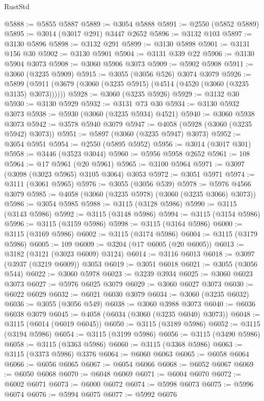 \begin{lexlean}{RustStd}
\begin{coremodule}
@5888 := @5855 @5887
@5889 := @3054 @5888
@5891 := @2550 (@5852 @5889)
@5895 := @3014 (@3017 @291) @3447 @2652
@5896 := @3132 @103
@5897 := @3130 @5896
@5898 := @3132 @291
@5899 := @3130 @5898
@5901 := @3131 @156 @30
@5902 := @3130 @5901
@5904 := @3131 @339 @22
@5906 := @3130 @5904 @3073
@5908 := @3060 @5906 @3073
@5909 := @5902 @5908
@5911 := @3060 (@3235 @5909)
@5915 := @3055 (@3056 @526) @3074 @3079
@5926 := @5899 (@5911 (@3679 (@3060 (@3235 @5915) (@4514 (@4520 (@3060 (@3235 @3135) @3073))))))
@5928 := @3060 (@3235 @5926)
@5929 := @3132 @30
@5930 := @3130 @5929
@5932 := @3131 @73 @30
@5934 := @3130 @5932 @3073
@5938 := @5930 (@3060 (@3235 @5934) @4521)
@5940 := @3060 @5938 @3073
@5942 := @3578 @5940 @3079
@5947 := @4058 (@5928 (@3060 (@3235 @5942) @3073))
@5951 := @5897 (@3060 (@3235 @5947) @3073)
@5952 := @3054 @5951
@5954 := @2550 (@5895 @5952)
@5956 := @3014 (@3017 @301)
@5958 := @3446 (@3523 @3044)
@5960 := @5956 @5958 @2652
@5961 := 108
@5964 := @17 @5961 (@20 @5961)
@5965 := @3100 @5964
@5971 := @3097 (@3098 (@3023 @5965) @3105 @3064) @3053
@5972 := @3051 @5971
@5974 := @3111 (@3061 @5965)
@5976 := @3055 (@3056 @539)
@5978 := @5976 @4566 @3079
@5985 := @4058 (@3060 (@3235 @5978) (@3060 (@3235 @3066) @3073))
@5986 := @3054 @5985
@5988 := @3115 (@3128 @5986)
@5990 := @3115 (@3143 @5986)
@5992 := @3115 (@3148 @5986)
@5994 := @3115 (@3154 @5986)
@5996 := @3115 (@3159 @5986)
@5998 := @3115 (@3164 @5986)
@6000 := @3115 (@3169 @5986)
@6002 := @3115 (@3174 @5986)
@6004 := @3115 (@3179 @5986)
@6005 := 109
@6009 := @3204 (@17 @6005 (@20 @6005))
@6013 := @3182 (@3121 (@3023 @6009) @3124)
@6014 := @3116 @6013
@6018 := @3097 (@3937 (@3219 @6009)) @3053
@6019 := @3051 @6018
@6021 := @3055 (@3056 @544)
@6022 := @3060 @5978
@6023 := @3239 @3934
@6025 := @3060 @6023 @3073
@6027 := @5976 @6025 @3079
@6029 := @3060 @6027 @3073
@6030 := @6022 @6029
@6032 := @6021 @6030 @3079
@6034 := @3060 (@3235 @6032)
@6036 := @3055 (@3056 @549)
@6038 := @3060 @3988 @3073
@6040 := @6036 @6038 @3079
@6045 := @4058 (@6034 (@3060 (@3235 @6040) @3073))
@6048 := @3115 (@6014 (@6019 @6045))
@6050 := @3115 (@3189 @5986)
@6052 := @3115 (@3194 @5986)
@6054 := @3115 (@3199 @5986)
@6056 := @3115 (@3490 @5986)
@6058 := @3115 (@3363 @5986)
@6060 := @3115 (@3368 @5986)
@6063 := @3115 (@3373 @5986) @3376
@6064 := @6060 @6063
@6065 := @6058 @6064
@6066 := @6056 @6065
@6067 := @6054 @6066
@6068 := @6052 @6067
@6069 := @6050 @6068
@6070 := @6048 @6069
@6071 := @6004 @6070
@6072 := @6002 @6071
@6073 := @6000 @6072
@6074 := @5998 @6073
@6075 := @5996 @6074
@6076 := @5994 @6075
@6077 := @5992 @6076

\end{coremodule}
\end{lexlean}
